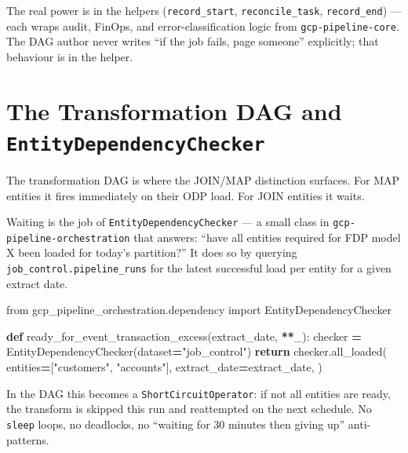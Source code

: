\documentclass[
  11pt,
  british,
  oneside]{book}
\newenvironment{Shaded}{\begin{snugshade}}{\end{snugshade}}
\newcommand{\ControlFlowTok}[1]{\textcolor[rgb]{0.13,0.29,0.53}{\textbf{#1}}}
\newcommand{\ImportTok}[1]{#1}
\newcommand{\KeywordTok}[1]{\textcolor[rgb]{0.13,0.29,0.53}{\textbf{#1}}}
\newcommand{\NormalTok}[1]{#1}
\newcommand{\OperatorTok}[1]{\textcolor[rgb]{0.81,0.36,0.00}{\textbf{#1}}}
\newcommand{\StringTok}[1]{\textcolor[rgb]{0.31,0.60,0.02}{#1}}
\begin{document}
The real power is in the helpers (\texttt{record\_start},
\texttt{reconcile\_task}, \texttt{record\_end}) --- each wraps audit,
FinOps, and error-classification logic from \texttt{gcp-pipeline-core}.
The DAG author never writes ``if the job fails, page someone''
explicitly; that behaviour is in the helper.

\hypertarget{the-transformation-dag-and-entitydependencychecker}{%
\section{\texorpdfstring{The Transformation DAG and
\texttt{EntityDependencyChecker}}{The Transformation DAG and EntityDependencyChecker}}\label{the-transformation-dag-and-entitydependencychecker}}

The transformation DAG is where the JOIN/MAP distinction surfaces. For
MAP entities it fires immediately on their ODP load. For JOIN entities
it waits.

Waiting is the job of \texttt{EntityDependencyChecker} --- a small class
in \texttt{gcp-pipeline-orchestration} that answers: ``have all entities
required for FDP model X been loaded for today's partition?'' It does so
by querying \texttt{job\_control.pipeline\_runs} for the latest
successful load per entity for a given extract date.

\begin{Shaded}
\begin{Highlighting}[]
\ImportTok{from}\NormalTok{ gcp\_pipeline\_orchestration.dependency }\ImportTok{import}\NormalTok{ EntityDependencyChecker}

\KeywordTok{def}\NormalTok{ ready\_for\_event\_transaction\_excess(extract\_date, }\OperatorTok{**}\NormalTok{\_):}
\NormalTok{    checker }\OperatorTok{=}\NormalTok{ EntityDependencyChecker(dataset}\OperatorTok{=}\StringTok{"job\_control"}\NormalTok{)}
    \ControlFlowTok{return}\NormalTok{ checker.all\_loaded(}
\NormalTok{        entities}\OperatorTok{=}\NormalTok{[}\StringTok{"customers"}\NormalTok{, }\StringTok{"accounts"}\NormalTok{],}
\NormalTok{        extract\_date}\OperatorTok{=}\NormalTok{extract\_date,}
\NormalTok{    )}
\end{Highlighting}
\end{Shaded}

In the DAG this becomes a \texttt{ShortCircuitOperator}: if not all
entities are ready, the transform is skipped this run and reattempted on
the next schedule. No \texttt{sleep} loops, no deadlocks, no ``waiting
for 30 minutes then giving up'' anti-patterns.
\end{document}
